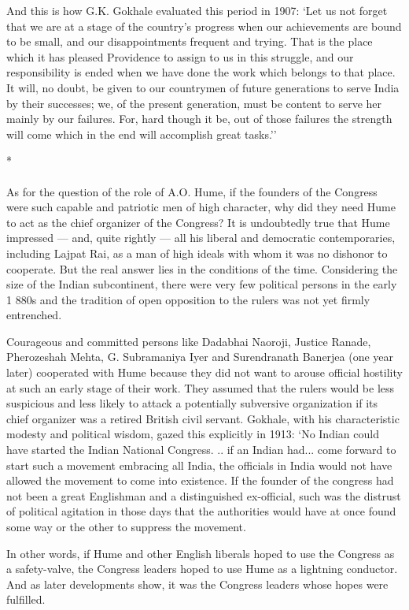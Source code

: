 And this is how G.K. Gokhale evaluated this period in 1907: `Let us not forget that we are at a stage of the country's progress when our achievements are bound to be small, and our disappointments frequent and trying. That is the place which it has pleased Providence to assign to us in this struggle, and our responsibility is ended when we have done the work which belongs to that place. It will, no doubt, be given to our countrymen of future generations to serve India by their successes; we, of the present generation, must be content to serve her mainly by our failures. For, hard though it be, out of those failures the strength will come which in the end will accomplish great tasks.''

\begin{center}*\end{center}

\paragraph*{}


As for the question of the role of A.O. Hume, if the founders of the Congress were such capable and patriotic men of high character, why did they need Hume to act as the chief organizer of the Congress? It is undoubtedly true that Hume impressed — and, quite rightly — all his liberal and democratic contemporaries, including Lajpat Rai, as a man of high ideals with whom it was no dishonor to cooperate. But the real answer lies in the conditions of the time. Considering the size of the Indian subcontinent, there were very few political persons in the early 1 880s and the tradition of open opposition to the rulers was not yet firmly entrenched.

Courageous and committed persons like Dadabhai Naoroji, Justice Ranade, Pherozeshah Mehta, G. Subramaniya Iyer and Surendranath Banerjea (one year later) cooperated with Hume because they did not want to arouse official hostility at such an early stage of their work. They assumed that the rulers would be less suspicious and less likely to attack a potentially subversive organization if its chief organizer was a retired British civil servant. Gokhale, with his characteristic modesty and political wisdom, gazed this explicitly in 1913: `No Indian could have started the Indian National Congress. .. if an Indian had... come forward to start such a movement embracing all India, the officials in India would not have allowed the movement to come into existence. If the founder of the congress had not been a great Englishman and a distinguished ex-official, such was the distrust of political agitation in those days that the authorities would have at once found some way or the other to suppress the movement.

In other words, if Hume and other English liberals hoped to use the Congress as a safety-valve, the Congress leaders hoped to use Hume as a lightning conductor. And as later developments show, it was the Congress leaders whose hopes were fulfilled.
